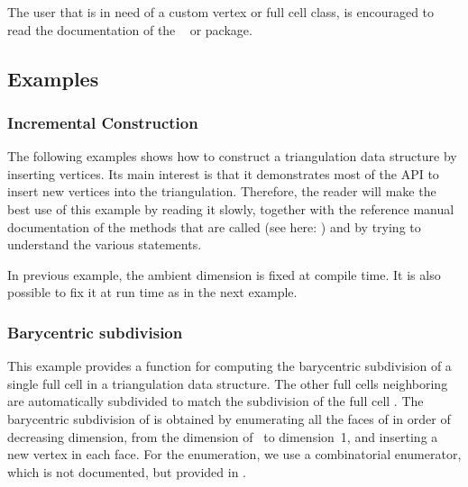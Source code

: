 \begin{ccAdvanced}
The user that is in need of a custom vertex or full cell class, is
encouraged to read the documentation of the \cgal\
  or   package. 
\end{ccAdvanced}


\subsection{Examples\label{triangulation:tds:examples}}

\subsubsection{Incremental Construction}
The following examples shows how to construct a triangulation data structure by
inserting vertices. Its main interest is that it demonstrates most of the API
to insert new vertices into the triangulation. Therefore, the reader will make
the best use of this example by reading it slowly, together with the reference
manual documentation of the methods that are called (see here:
) and by trying to understand the various 
\ccc{assert(...)} statements.


In previous example, the ambient dimension is fixed at compile time.
It is also possible to fix it at run time as in the next example.


\subsubsection{Barycentric subdivision}
This example provides a function for computing the barycentric subdivision of a
single full cell  in a triangulation data structure. The other 
full cells neighboring  are automatically subdivided to match the
subdivision of the full cell . The barycentric subdivision of \ccc{c} is
obtained by enumerating all the faces of  in order of decreasing
dimension, from the dimension of~\ccc{c} to dimension~1, and inserting a new
vertex in each face. For the enumeration, we use a combinatorial enumerator,
which is not documented, but provided in \cgal.



